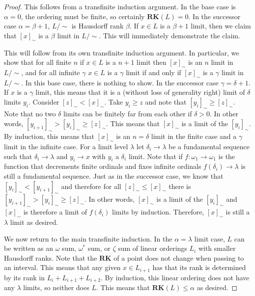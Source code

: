 \documentclass[11pt]{amsart}
\theoremstyle{remark}
\def\RK{\textbf{RK}}
\begin{document}
\begin{proof}
This follows from a transfinite induction argument.
In the base case is $\alpha=0$, the ordering must be finite, so certainly $\RK(L)=0$.
In the successor case $\alpha=\beta+1$, $L/\sim$ is Hausdorff rank $\beta$.
If $x\in L$ is a $\beta+1$ limit, then we claim that $[x]_\sim$ is a $\beta$ limit in $L/\sim$.
This will immediately demonstrate the claim.

This will follow from its own transfinite induction argument.
In particular, we show that for all finite $n$ if $x\in L$ is a $n+1$ limit then  $[x]_\sim$ is an $n$ limit in $L/\sim$, and for all infinite $\gamma$ $x\in L$ is a $\gamma$ limit if and only if $[x]_\sim$ is a $\gamma$ limit in $L/\sim$.
In this base case, there is nothing to show.
In the successor case $\gamma=\delta+1$.
If $x$ is a $\gamma$ limit, this means that it is a (without loss of generality right) limit of $\delta$ limits $y_i$.
Consider $[z]_\sim<[x]_\sim$.
Take $y_i\geq z$ and note that $[y_i]_\sim\geq [z]_\sim$.
Note that no two $\delta$ limits can be finitely far from each other if $\delta>0$.
In other words, $[y_{i+1}]_{\sim}> [y_i]_\sim\geq [z]_\sim$.
This means that $[x]_\sim$ is a limit of the $[y_i]_\sim$.
By induction, this means that $[x]_\sim$ is an $n=\delta$ limit in the finite case and a $\gamma$ limit in the infinite case.
For a limit level $\lambda$ let $\delta_i\to\lambda$ be a fundamental sequence such that $\delta_i\to \lambda$ and $y_i\to x$ with $y_i$ a $\delta_i$ limit.
Note that if $f:\omega_1\to\omega_1$ is the function that decrements finite ordinals and fixes infinite ordinals $f(\delta_i)\to \lambda$ is still a fundamental sequence.
Just as in the successor case, we know that $[y_i]_\sim < [y_{i+1}]_\sim$ and therefore for all $[z]_\sim\leq[x]_\sim$ there is $[y_{i+1}]_{\sim}> [y_i]_\sim\geq [z]_\sim$.
In other words, $[x]_\sim$ is a limit of the $[y_i]_\sim$ and $[x]_\sim$ is therefore a limit of $f(\delta_i)$ limits by induction.
Therefore, $[x]_\sim$ is still a $\lambda$ limit as desired.

We now return to the main transfinite induction.
In the $\alpha=\lambda$ limit case, $L$ can be written as an $\omega$ sum, $\omega^*$ sum, or $\zeta$ sum of linear orderings $L_i$ with smaller Hausdorff ranks.
Note that the $\RK$ of a point does not change when passing to an interval.
This means that any given $x\in L_{i+1}$ has that its rank is determined by its rank in $L_i+  L_{i+1}+ L_{i+2}$.
By induction, this linear ordering does not have any $\lambda$ limits, so neither does $L$.
This means that $\RK(L)\leq\alpha$ as desired.
\end{proof}
\end{document}

